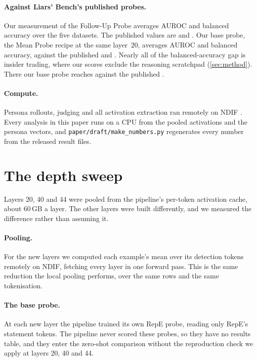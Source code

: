 \paragraph{Against Liars' Bench's published probes.} Our measurement of the Follow-Up Probe
averages  AUROC and  balanced accuracy over the five
datasets. The published values are  and 
\citep[Table~7]{kretschmar2025liars}. Our base probe, the Mean Probe recipe at the same layer~20,
averages  AUROC and  balanced accuracy, against the
published  and  \citep[Table~6]{kretschmar2025liars}.
Nearly all of the balanced-accuracy gap is insider trading, where our scores exclude the reasoning
scratchpad (\cref{sec:method}). There our base probe reaches  against the
published .

\paragraph{Compute.} Persona rollouts, judging and all activation extraction ran remotely on NDIF
\citep{fiottokaufman2024nnsight}. Every analysis in this paper runs on a CPU from the pooled
activations and the persona vectors, and \nolinkurl{paper/draft/make_numbers.py} regenerates every number
from the released result files.

\section{The depth sweep}
\label{app:depth}

Layers 20, 40 and 44 were pooled from the pipeline's per-token activation cache, about 60\,GB a
layer. The other  layers were built differently, and we measured the difference
rather than assuming it.

\paragraph{Pooling.} For the new layers we computed each example's mean over its detection tokens
remotely on NDIF, fetching every layer in one forward pass. This is the same reduction the local
pooling performs, over the same rows and the same tokenisation.

\paragraph{The base probe.} At each new layer the pipeline trained its own RepE probe, reading
only RepE's statement tokens. The pipeline never scored these probes, so they have no results
table, and they enter the zero-shot comparison without the reproduction check we apply at layers
20, 40 and 44.

